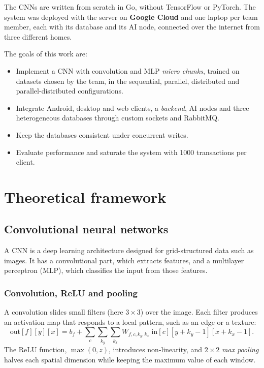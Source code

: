 \documentclass[10pt,a4paper]{article}
\begin{document}
The CNNs are written from scratch in Go, without TensorFlow or PyTorch. The system was deployed with
the server on \textbf{Google Cloud} and one laptop per team member, each with its database and its AI
node, connected over the internet from three different homes.

The goals of this work are:
\begin{itemize}
    \item Implement a CNN with convolution and MLP \textit{micro chunks}, trained on datasets chosen by
    the team, in the sequential, parallel, distributed and parallel-distributed configurations.
    \item Integrate Android, desktop and web clients, a \textit{backend}, AI nodes and three
    heterogeneous databases through custom sockets and RabbitMQ.
    \item Keep the databases consistent under concurrent writes.
    \item Evaluate performance and saturate the system with 1000 transactions per client.
\end{itemize}

\section{Theoretical framework}

\subsection{Convolutional neural networks}

A CNN is a deep learning architecture designed for grid-structured data such as images. It has a
convolutional part, which extracts features, and a multilayer perceptron (MLP), which classifies the
input from those features.

\subsubsection{Convolution, ReLU and pooling}

A convolution slides small filters (here $3 \times 3$) over the image. Each filter produces an
activation map that responds to a local pattern, such as an edge or a texture:
\[
\mathrm{out}[f][y][x] = b_f + \sum_{c}\sum_{k_y}\sum_{k_x} W_{f,c,k_y,k_x}\;
\mathrm{in}[c][y+k_y-1][x+k_x-1].
\]
The ReLU function, $\max(0,z)$, introduces non-linearity, and $2 \times 2$ \textit{max pooling} halves
each spatial dimension while keeping the maximum value of each window.
\end{document}
